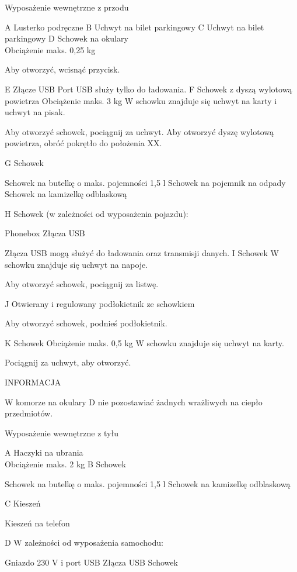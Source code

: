 Wyposażenie wewnętrzne z przodu


A Lusterko podręczne
B Uchwyt na bilet parkingowy
C Uchwyt na bilet parkingowy
D Schowek na okulary \\ Obciążenie maks. 0,25 kg
\begin{itemizeArrow}
	\itemArrow Aby otworzyć, wcisnąć przycisk.
\end{itemizeArrow}
E Złącze USB
Port USB służy tylko do ładowania.
F Schowek z dyszą wylotową powietrza
Obciążenie maks. 3 kg
W schowku znajduje się uchwyt na karty i uchwyt na pisak.
\begin{itemizeArrow}
	\itemArrow Aby otworzyć schowek, pociągnij za uchwyt.
	\itemArrow Aby otworzyć dyszę wylotową powietrza, obróć pokrętło do położenia XX.
\end{itemizeArrow}
G Schowek
\begin{itemizeTriangle}
	\itemTriangle Schowek na butelkę o maks. pojemności 1,5 l
	\itemTriangle Schowek na pojemnik na odpady
	\itemTriangle Schowek na kamizelkę odblaskową
\end{itemizeTriangle}
H Schowek (w zależności od wyposażenia pojazdu):
\begin{itemizeTriangle}
	\itemTriangle Phonebox
	\itemTriangle Złącza USB
\end{itemizeTriangle}
Złącza USB mogą służyć do ładowania oraz transmisji danych.
I Schowek
W schowku znajduje się uchwyt na napoje.
\begin{itemizeArrow}
	\itemArrow Aby otworzyć schowek, pociągnij za listwę.
\end{itemizeArrow}
J Otwierany i regulowany podłokietnik ze schowkiem
\begin{itemizeArrow}
	\itemArrow Aby otworzyć schowek, podnieś podłokietnik.
\end{itemizeArrow}
K Schowek
Obciążenie maks. 0,5 kg
W schowku znajduje się uchwyt na karty.
\begin{itemizeArrow}
	\itemArrow Pociągnij za uchwyt, aby otworzyć.
\end{itemizeArrow}

INFORMACJA
\begin{itemizeTriangle}
	\itemTriangle W komorze na okulary D nie pozostawiać żadnych wrażliwych na ciepło przedmiotów.
\end{itemizeTriangle}

Wyposażenie wewnętrzne z tyłu


A Haczyki na ubrania \\ Obciążenie maks. 2 kg
B Schowek
\begin{itemizeTriangle}
	\itemTriangle Schowek na butelkę o maks. pojemności 1,5 l
	\itemTriangle Schowek na kamizelkę odblaskową
\end{itemizeTriangle}
C Kieszeń
\begin{itemizeTriangle}
	\itemTriangle Kieszeń na telefon
\end{itemizeTriangle}
D W zależności od wyposażenia samochodu:
\begin{itemizeTriangle}
	\itemTriangle Gniazdo 230 V i port USB
	\itemTriangle Złącza USB
	\itemTriangle Schowek
\end{itemizeTriangle}


